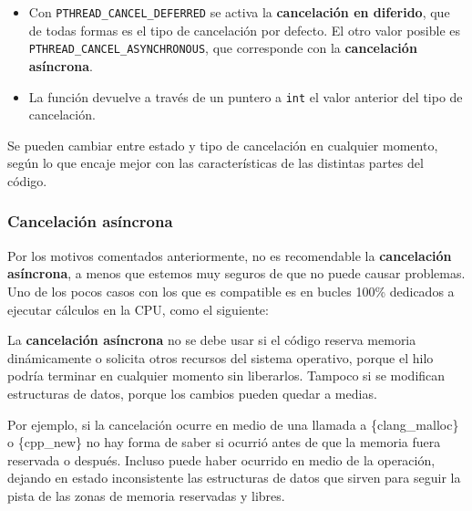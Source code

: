 \begin{itemize}
\item
  Con \texttt{PTHREAD\_CANCEL\_DEFERRED} se activa la
  \textbf{cancelación en diferido}, que de todas formas es el tipo de
  cancelación por defecto. El otro valor posible es
  \texttt{PTHREAD\_CANCEL\_ASYNCHRONOUS}, que corresponde con la
  \textbf{cancelación asíncrona}.
\item
  La función devuelve a través de un puntero a \texttt{int} el valor
  anterior del tipo de cancelación.
\end{itemize}

Se pueden cambiar entre estado y tipo de cancelación en cualquier
momento, según lo que encaje mejor con las características de las
distintas partes del código.

\subsubsection{Cancelación
asíncrona}\label{_cancelaciuxf3n_asuxedncrona}

{} Por los motivos comentados anteriormente, no es recomendable la
\textbf{cancelación asíncrona}, a menos que estemos muy seguros de que
no puede causar problemas. Uno de los pocos casos con los que es
compatible es en bucles 100\% dedicados a ejecutar cálculos en la CPU,
como el siguiente:

\begin{Shaded}
\begin{Highlighting}[]
\OperatorTok{=} \OperatorTok{;}
 \OperatorTok{(} \OperatorTok{=} \OperatorTok{;}\OperatorTok{\textless{}=}\OperatorTok{;}\OperatorTok{++} \OperatorTok{)}
\OperatorTok{\{}
\OperatorTok{=}\OperatorTok{*}\OperatorTok{;}
\OperatorTok{\}}
\end{Highlighting}
\end{Shaded}

La \textbf{cancelación asíncrona} no se debe usar si el código reserva
memoria dinámicamente o solicita otros recursos del sistema operativo,
porque el hilo podría terminar en cualquier momento sin liberarlos.
Tampoco si se modifican estructuras de datos, porque los cambios pueden
quedar a medias.

Por ejemplo, si la cancelación ocurre en medio de una llamada a
\{clang\_malloc\} o \{cpp\_new\} no hay forma de saber si ocurrió antes
de que la memoria fuera reservada o después. Incluso puede haber
ocurrido en medio de la operación, dejando en estado inconsistente las
estructuras de datos que sirven para seguir la pista de las zonas de
memoria reservadas y libres.

